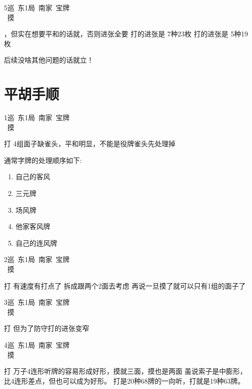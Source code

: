 \documentclass[小V的日麻笔记.tex]{subfiles}
\begin{document}
5巡\ 东1局\ 南家\ 宝牌\\
\ 摸 \\
\begin{itemize}
\arrowitem {}，但实在想要平和的话就，否则进张全要
\arrowitem 打的进张是 7种23枚
\arrowitem 打的进张是 5种19枚
\end{itemize}

后续没啥其他问题的话就立！

\section{平胡手顺}
1巡\ 东1局\ 南家\ 宝牌\\
\ 摸 \\
\begin{itemize}
\arrowitem 打
\arrowitem 4组面子缺雀头，平和明显，不能是役牌雀头先处理掉
\end{itemize}

通常字牌的处理顺序如下:
\begin{enumerate}
\item 自己的客风
\item 三元牌
\item 场风牌
\item 他家客风牌
\item 自己的连风牌
\end{enumerate}

2巡\ 东1局\ 南家\ 宝牌\\
\ 摸 \\
\begin{itemize}
\arrowitem 打
\arrowitem 有速度有打点了
\arrowitem {}拆成跟两个2面去考虑
\arrowitem 再说一旦摸了就可以只有1组的面子了
\end{itemize}

3巡\ 东1局\ 南家\ 宝牌\\
\ 摸 \\
\begin{itemize}
\arrowitem 打
\arrowitem 但为了防守打的进张变窄
\end{itemize}

4巡\ 东1局\ 南家\ 宝牌\\
\ 摸 \\
\begin{itemize}
\arrowitem 打
\arrowitem 万子4连形听牌的容易形成好形，摸就三面，摸也是两面
\arrowitem 虽说索子是中膨形，比4连形差点，但也可以成为好形。
\arrowitem 打是20种68牌的一向听，打就是19种63牌。
\end{itemize}
\end{document}

